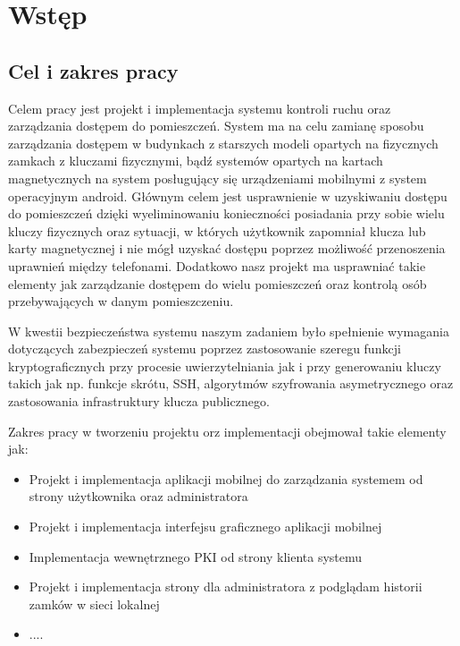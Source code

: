 \newpage\section{Wstęp}\label{sec:wstep}

\subsection{Cel i zakres pracy}

	Celem pracy jest projekt i implementacja systemu kontroli ruchu oraz zarządzania dostępem do pomieszczeń. System ma na celu zamianę sposobu zarządzania dostępem w budynkach z starszych modeli opartych na fizycznych zamkach z kluczami fizycznymi, bądź systemów opartych na kartach magnetycznych na system posługujący się urządzeniami mobilnymi z system operacyjnym android. Głównym celem jest usprawnienie w uzyskiwaniu dostępu do pomieszczeń dzięki wyeliminowaniu konieczności posiadania przy sobie wielu kluczy fizycznych oraz sytuacji, w których użytkownik zapomniał klucza lub karty magnetycznej i nie mógł uzyskać dostępu poprzez możliwość przenoszenia uprawnień między telefonami. Dodatkowo nasz projekt ma usprawniać takie elementy jak zarządzanie dostępem do wielu pomieszczeń oraz kontrolą osób przebywających w danym pomieszczeniu.
	
W kwestii bezpieczeństwa systemu naszym zadaniem było spełnienie wymagania dotyczących zabezpieczeń systemu poprzez zastosowanie szeregu funkcji kryptograficznych przy procesie uwierzytelniania jak i
przy generowaniu kluczy takich jak np. funkcje skrótu, SSH, algorytmów szyfrowania
asymetrycznego oraz zastosowania infrastruktury klucza publicznego.

Zakres pracy w tworzeniu projektu orz implementacji obejmował takie elementy jak:
\begin{itemize}
\item Projekt i implementacja aplikacji mobilnej do zarządzania systemem od strony użytkownika oraz administratora
\item Projekt i implementacja interfejsu graficznego aplikacji mobilnej
\item Implementacja wewnętrznego PKI od strony klienta systemu
\item Projekt i implementacja strony dla administratora z podglądam historii zamków w sieci lokalnej
\item ....
\end{itemize}
